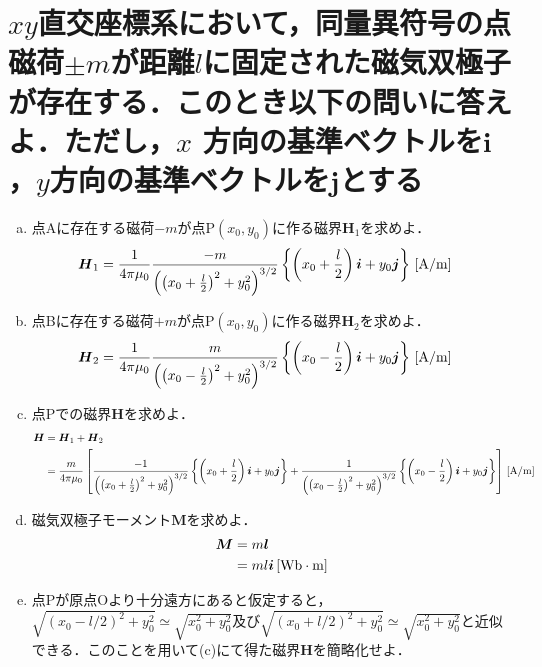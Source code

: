 \documentclass[dvipdfmx]{ujarticle}
\begin{document}
\section{$xy$直交座標系において，同量異符号の点磁荷$\pm m$が距離$l$に固定された磁気双極子が存在する．このとき以下の問いに答えよ．ただし，$x$ 方向の基準ベクトルを$\boldsymbol{i}$，$y$方向の基準ベクトルを$\boldsymbol{j}$とする}
\begin{enumerate}[(a)]
	\item 点Aに存在する磁荷$-m$が点P$(x_0,y_0)$に作る磁界$\boldsymbol{H}_{1}$を求めよ．
	\begin{align*}
		\boldsymbol{H}_{1}&=\frac{1}{4\pi \mu_{0}}\frac{-m}{\left(\left(x_{0}+\frac{l}{2}\right)^{2}+y_{0}^{2}\right)^{3/2}} \left\{ \left(x_{0}+\frac{l}{2}\right)\boldsymbol{i}+y_{0}\boldsymbol{j}\right\}\,[\rm{A/m}]
	\end{align*}
	\item 点Bに存在する磁荷$+m$が点P$(x_0,y_0)$に作る磁界$\boldsymbol{H}_{2}$を求めよ．
	\begin{align*}
		\boldsymbol{H}_{2}&=\frac{1}{4\pi \mu_{0}}\frac{m}{\left(\left(x_{0}-\frac{l}{2}\right)^{2}+y_{0}^{2}\right)^{3/2}} \left\{ \left(x_{0}-\frac{l}{2}\right)\boldsymbol{i}+y_{0}\boldsymbol{j}\right\}\,[\rm{A/m}]
	\end{align*}
	\item 点Pでの磁界$\boldsymbol{H}$を求めよ．
	\begin{align*}
		\boldsymbol{H}&=\boldsymbol{H}_{1}+\boldsymbol{H}_{2}\\
		&=\frac{m}{4\pi \mu_{0}}\left[\frac{-1}{\left(\left(x_{0}+\frac{l}{2}\right)^{2}+y_{0}^{2}\right)^{3/2}} \left\{ \left(x_{0}+\frac{l}{2}\right)\boldsymbol{i}+y_{0}\boldsymbol{j}\right\}+\frac{1}{\left(\left(x_{0}-\frac{l}{2}\right)^{2}+y_{0}^{2}\right)^{3/2}} \left\{ \left(x_{0}-\frac{l}{2}\right)\boldsymbol{i}+y_{0}\boldsymbol{j}\right\}\right]\,[\rm{A/m}]
	\end{align*}
	\item 磁気双極子モーメント$\boldsymbol{M}$を求めよ．
	\begin{align*}
		\boldsymbol{M}&=m\boldsymbol{l}\\
		&=ml\boldsymbol{i}\,[\rm{Wb\cdot m}]
	\end{align*}
	\item 点Pが原点Oより十分遠方にあると仮定すると，$\sqrt{(x_{0}-l/2)^{2}+y_{0}^{2}}\simeq \sqrt{x_{0}^{2}+y_{0}^{2}}$及び$\sqrt{(x_{0}+l/2)^{2}+y_{0}^{2}} \simeq \sqrt{x_{0}^{2}+y_{0}^{2}}$と近似できる．このことを用いて(c)にて得た磁界$\boldsymbol{H}$を簡略化せよ．

\end{enumerate}
\end{document}
